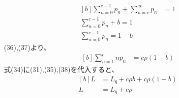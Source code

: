 \documentclass{report}
\begin{document}
\begin{CJK}{UTF8}{min}
\begin{equation}
        \begin{aligned}[b]
            \sum_{n=0}^{c-1}p_{n}+\sum_{n=c}^{\infty}p_{n} & =1 \\
            \sum_{n=0}^{c-1}p_{n}+b=1                           \\
            \sum_{n=0}^{c-1}p_{n}=1-b
        \end{aligned}
    \end{equation}
    (36),(37)より、
    \begin{equation}
        \begin{aligned}[b]
            \sum_{n=1}^{c}np_n & =c\rho(1-b)
        \end{aligned}
    \end{equation}
    式(34)に(31),(35),(38)を代入すると、
    \begin{equation}
        \begin{aligned}[b]
            L & =L_q+c\rho b+c\rho (1-b) \\
            L & =L_q+c\rho
        \end{aligned}
    \end{equation}

    \newpage

\end{CJK}
\end{document}
